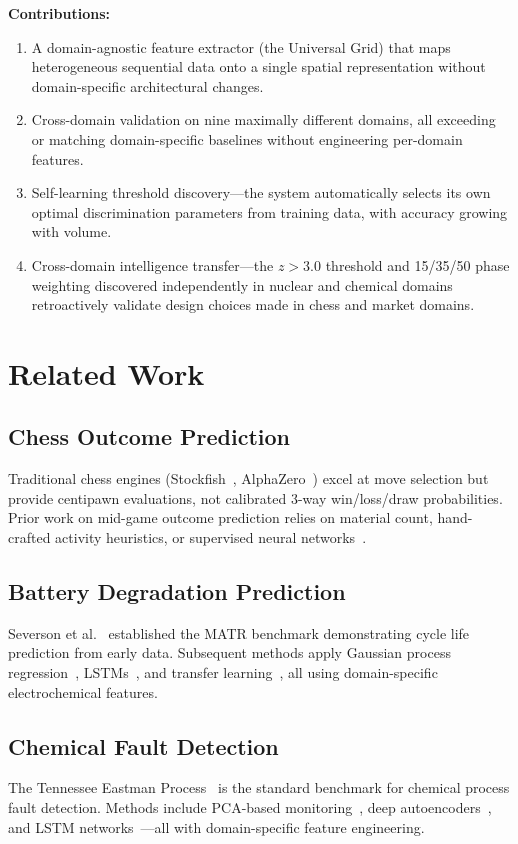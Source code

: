 \documentclass[12pt,a4paper]{article}
\begin{document}
\noindent\textbf{Contributions:}
\begin{enumerate}
  \item A domain-agnostic feature extractor (the Universal Grid) that maps heterogeneous
  sequential data onto a single spatial representation without domain-specific architectural
  changes.
  \item Cross-domain validation on nine maximally different domains, all exceeding or matching
  domain-specific baselines without engineering per-domain features.
  \item Self-learning threshold discovery---the system automatically selects its own optimal
  discrimination parameters from training data, with accuracy growing with volume.
  \item Cross-domain intelligence transfer---the $z{>}3.0$ threshold and 15/35/50 phase weighting
  discovered independently in nuclear and chemical domains retroactively validate design choices
  made in chess and market domains.
\end{enumerate}

\section{Related Work}

\subsection{Chess Outcome Prediction}
Traditional chess engines (Stockfish~\cite{stockfish}, AlphaZero~\cite{silver2018}) excel at
move selection but provide centipawn evaluations, not calibrated 3-way
win/loss/draw probabilities. Prior work on mid-game outcome prediction relies on material count,
hand-crafted activity heuristics, or supervised neural networks~\cite{david2016}.

\subsection{Battery Degradation Prediction}
Severson et al.~\cite{severson2019} established the MATR benchmark demonstrating cycle life
prediction from early data. Subsequent methods apply Gaussian process
regression~\cite{richardson2017}, LSTMs~\cite{zhang2018}, and transfer learning~\cite{deng2022},
all using domain-specific electrochemical features.

\subsection{Chemical Fault Detection}
The Tennessee Eastman Process~\cite{tep1993} is the standard benchmark for chemical process fault
detection. Methods include PCA-based monitoring~\cite{chiang2000}, deep
autoencoders~\cite{zhang2017}, and LSTM networks~\cite{wu2018}---all with domain-specific feature
engineering.
\end{document}
